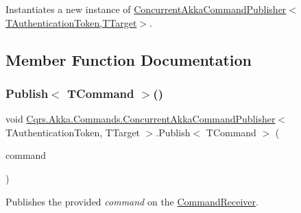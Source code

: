 Instantiates a new instance of \hyperlink{classCqrs_1_1Akka_1_1Commands_1_1ConcurrentAkkaCommandPublisher_a289c81c8877d2cf83b26f6be7e56f26b_a289c81c8877d2cf83b26f6be7e56f26b}{Concurrent\+Akka\+Command\+Publisher$<$\+T\+Authentication\+Token,\+T\+Target$>$}. 



\subsection{Member Function Documentation}
\mbox{\label{classCqrs_1_1Akka_1_1Commands_1_1ConcurrentAkkaCommandPublisher_a1644fd35a9946df2e99be1044324c4cf_a1644fd35a9946df2e99be1044324c4cf}} 
\subsubsection{\texorpdfstring{Publish$<$ T\+Command $>$()}{Publish< TCommand >()}\hspace{0.1cm}{\footnotesize\ttfamily [1/2]}}
{\footnotesize\ttfamily void \hyperlink{classCqrs_1_1Akka_1_1Commands_1_1ConcurrentAkkaCommandPublisher}{Cqrs.\+Akka.\+Commands.\+Concurrent\+Akka\+Command\+Publisher}$<$ T\+Authentication\+Token, T\+Target $>$.Publish$<$ T\+Command $>$ (\begin{DoxyParamCaption}\item[{T\+Command}]{command }\end{DoxyParamCaption})}



Publishes the provided {\itshape command}  on the \hyperlink{classCqrs_1_1Akka_1_1Commands_1_1ConcurrentAkkaCommandPublisher_a000c2cddf20768b5feec16a8f4e02587_a000c2cddf20768b5feec16a8f4e02587}{Command\+Receiver}. 

